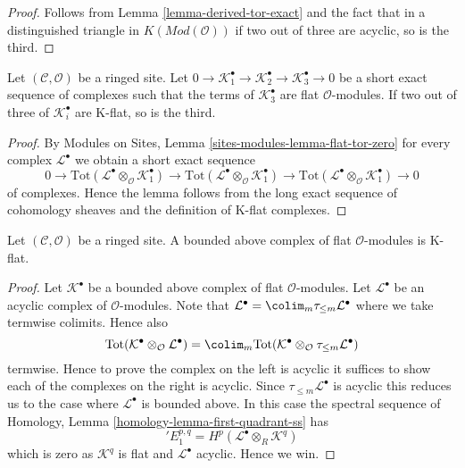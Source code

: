\begin{proof}
Follows from
Lemma \ref{lemma-derived-tor-exact}
and the fact that in a distinguished triangle in
$K(\textit{Mod}(\mathcal{O}))$
if two out of three are acyclic, so is the third.
\end{proof}

\begin{lemma}
\label{lemma-K-flat-two-out-of-three-ses}
Let $(\mathcal{C}, \mathcal{O})$ be a ringed site. Let
$0 \to \mathcal{K}_1^\bullet \to \mathcal{K}_2^\bullet \to
\mathcal{K}_3^\bullet \to 0$ be a short exact sequence of complexes
such that the terms of $\mathcal{K}_3^\bullet$ are flat $\mathcal{O}$-modules.
If two out of three of $\mathcal{K}_i^\bullet$ are K-flat, so is the third.
\end{lemma}

\begin{proof}
By Modules on Sites, Lemma \ref{sites-modules-lemma-flat-tor-zero}
for every complex $\mathcal{L}^\bullet$
we obtain a short exact sequence
$$
0 \to
\text{Tot}(\mathcal{L}^\bullet \otimes_\mathcal{O} \mathcal{K}_1^\bullet) \to
\text{Tot}(\mathcal{L}^\bullet \otimes_\mathcal{O} \mathcal{K}_1^\bullet) \to
\text{Tot}(\mathcal{L}^\bullet \otimes_\mathcal{O} \mathcal{K}_1^\bullet) \to 0
$$
of complexes. Hence the lemma follows from the long exact sequence of
cohomology sheaves and the definition of K-flat complexes.
\end{proof}

\begin{lemma}
\label{lemma-bounded-flat-K-flat}
Let $(\mathcal{C}, \mathcal{O})$ be a ringed site. A bounded above complex
of flat $\mathcal{O}$-modules is K-flat.
\end{lemma}

\begin{proof}
Let $\mathcal{K}^\bullet$ be a bounded above complex of flat
$\mathcal{O}$-modules. Let $\mathcal{L}^\bullet$ be an acyclic complex
of $\mathcal{O}$-modules. Note that
$\mathcal{L}^\bullet = \colim_m \tau_{\leq m}\mathcal{L}^\bullet$
where we take termwise colimits. Hence also
$$
\text{Tot}(\mathcal{K}^\bullet \otimes_\mathcal{O} \mathcal{L}^\bullet)
=
\colim_m \text{Tot}(
\mathcal{K}^\bullet \otimes_\mathcal{O} \tau_{\leq m}\mathcal{L}^\bullet)
$$
termwise. Hence to prove the complex on the left is acyclic it suffices
to show each of the complexes on the right is acyclic. Since
$\tau_{\leq m}\mathcal{L}^\bullet$ is acyclic this reduces us to the
case where $\mathcal{L}^\bullet$ is bounded above.
In this case the spectral sequence of
Homology, Lemma \ref{homology-lemma-first-quadrant-ss}
has
$$
{}'E_1^{p, q} = H^p(\mathcal{L}^\bullet \otimes_R \mathcal{K}^q)
$$
which is zero as $\mathcal{K}^q$ is flat and $\mathcal{L}^\bullet$ acyclic.
Hence we win.
\end{proof}

